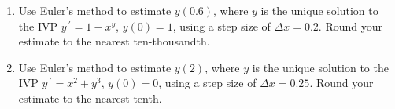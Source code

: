 \documentclass{ximera}
\begin{document}
\begin{enumerate}[label=(\arabic*)]
\item Use Euler's method to estimate $y(0.6)$, where $y$ is the unique solution to the IVP $y\,^{\prime}=1- x^y$, $y(0)=1$, using a step size of $\Delta x=0.2$.  Round your estimate to the nearest ten-thousandth. 






\item Use Euler's method to estimate $y(2)$, where $y$ is the unique solution to the IVP $y\,^{\prime}=x^2+y^3$, $y(0)=0$, using a step size of $\Delta x=0.25$.  Round your estimate to the nearest tenth. 












\end{enumerate}
\end{document}
